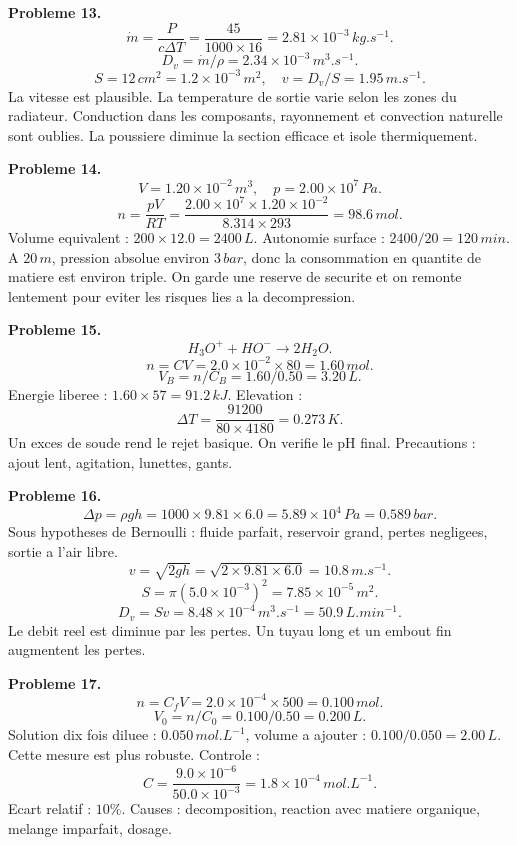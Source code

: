 \documentclass[11pt,a4paper]{article}
\begin{document}
\begin{corrige}
\textbf{Probleme 13.}
\[
\dot m=\frac{P}{c\Delta T}=\frac{45}{1000\times16}=2.81\times10^{-3}\,kg.s^{-1}.
\]
\[
D_v=\dot m/\rho=2.34\times10^{-3}\,m^3.s^{-1}.
\]
\[
S=12\,cm^2=1.2\times10^{-3}\,m^2,
\quad v=D_v/S=1.95\,m.s^{-1}.
\]
La vitesse est plausible. La temperature de sortie varie selon les zones du radiateur. Conduction dans les composants, rayonnement et convection naturelle sont oublies. La poussiere diminue la section efficace et isole thermiquement.
\end{corrige}

\begin{corrige}
\textbf{Probleme 14.}
\[
V=1.20\times10^{-2}\,m^3,\quad p=2.00\times10^7\,Pa.
\]
\[
n=\frac{pV}{RT}=\frac{2.00\times10^7\times1.20\times10^{-2}}{8.314\times293}=98.6\,mol.
\]
Volume equivalent : \(200\times12.0=2400\,L\). Autonomie surface : \(2400/20=120\,min\). A \(20\,m\), pression absolue environ \(3\,bar\), donc la consommation en quantite de matiere est environ triple. On garde une reserve de securite et on remonte lentement pour eviter les risques lies a la decompression.
\end{corrige}

\begin{corrige}
\textbf{Probleme 15.}
\[
H_3O^+ + HO^-\rightarrow2H_2O.
\]
\[
n=CV=2.0\times10^{-2}\times80=1.60\,mol.
\]
\[
V_B=n/C_B=1.60/0.50=3.20\,L.
\]
Energie liberee : \(1.60\times57=91.2\,kJ\). Elevation :
\[
\Delta T=\frac{91200}{80\times4180}=0.273\,K.
\]
Un exces de soude rend le rejet basique. On verifie le pH final. Precautions : ajout lent, agitation, lunettes, gants.
\end{corrige}

\begin{corrige}
\textbf{Probleme 16.}
\[
\Delta p=\rho gh=1000\times9.81\times6.0=5.89\times10^4\,Pa=0.589\,bar.
\]
Sous hypotheses de Bernoulli : fluide parfait, reservoir grand, pertes negligees, sortie a l'air libre.
\[
v=\sqrt{2gh}=\sqrt{2\times9.81\times6.0}=10.8\,m.s^{-1}.
\]
\[
S=\pi(5.0\times10^{-3})^2=7.85\times10^{-5}\,m^2.
\]
\[
D_v=Sv=8.48\times10^{-4}\,m^3.s^{-1}=50.9\,L.min^{-1}.
\]
Le debit reel est diminue par les pertes. Un tuyau long et un embout fin augmentent les pertes.
\end{corrige}

\begin{corrige}
\textbf{Probleme 17.}
\[
n=C_fV=2.0\times10^{-4}\times500=0.100\,mol.
\]
\[
V_0=n/C_0=0.100/0.50=0.200\,L.
\]
Solution dix fois diluee : \(0.050\,mol.L^{-1}\), volume a ajouter : \(0.100/0.050=2.00\,L\). Cette mesure est plus robuste. Controle :
\[
C=\frac{9.0\times10^{-6}}{50.0\times10^{-3}}=1.8\times10^{-4}\,mol.L^{-1}.
\]
Ecart relatif : \(10\%\). Causes : decomposition, reaction avec matiere organique, melange imparfait, dosage.
\end{corrige}
\end{document}
